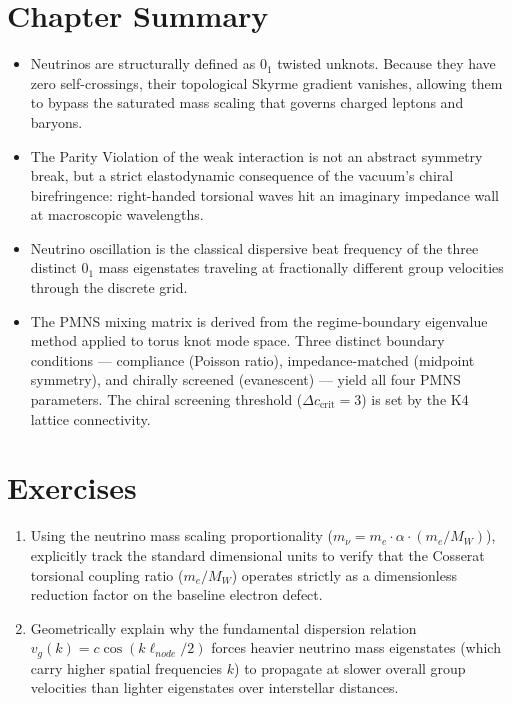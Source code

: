 \section*{Chapter Summary}
\begin{itemize}
    \item Neutrinos are structurally defined as $0_1$ twisted unknots. Because they have zero self-crossings, their topological Skyrme gradient vanishes, allowing them to bypass the saturated mass scaling that governs charged leptons and baryons.
    \item The Parity Violation of the weak interaction is not an abstract symmetry break, but a strict elastodynamic consequence of the vacuum's chiral birefringence: right-handed torsional waves hit an imaginary impedance wall at macroscopic wavelengths.
    \item Neutrino oscillation is the classical dispersive beat frequency of the three distinct $0_1$ mass eigenstates traveling at fractionally different group velocities through the discrete grid.
    \item The PMNS mixing matrix is derived from the regime-boundary eigenvalue method applied to torus knot mode space. Three distinct boundary conditions --- compliance (Poisson ratio), impedance-matched (midpoint symmetry), and chirally screened (evanescent) --- yield all four PMNS parameters. The chiral screening threshold ($\Delta c_{\text{crit}} = 3$) is set by the K4 lattice connectivity.
\end{itemize}

\section*{Exercises}
\begin{enumerate}
    \item Using the neutrino mass scaling proportionality ($m_\nu = m_e \cdot \alpha \cdot (m_e/M_W)$), explicitly track the standard dimensional units to verify that the Cosserat torsional coupling ratio ($m_e/M_W$) operates strictly as a dimensionless reduction factor on the baseline electron defect.
    \item Geometrically explain why the fundamental dispersion relation $v_g(k) = c \cos(k \ell_{node}/2)$ forces heavier neutrino mass eigenstates (which carry higher spatial frequencies $k$) to propagate at slower overall group velocities than lighter eigenstates over interstellar distances.
\end{enumerate}